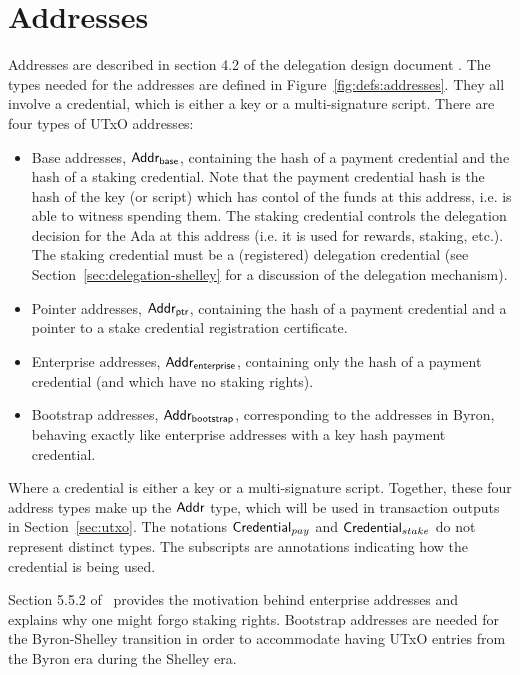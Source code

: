 \section{Addresses}
\label{sec:addresses}

Addresses are described in section 4.2 of the delegation design document \cite{delegation_design}.
The types needed for the addresses are defined in Figure~\ref{fig:defs:addresses}.
They all involve a credential, which is either a key or a multi-signature script.
There are four types of UTxO addresses:
\begin{itemize}
\item Base addresses, $\mathsf{Addr_{base}}$, containing the hash of a payment credential and
  the hash of a staking credential. Note that the payment credential hash is the
  hash of the key (or script) which has contol of the funds at this address,
  i.e. is able to witness spending
  them. The staking credential controls the delegation
  decision for the Ada at this address (i.e. it is used for rewards, staking,
  etc.).
  The staking credential
  must be a (registered) delegation credential (see Section~\ref{sec:delegation-shelley}
  for a discussion of the delegation mechanism).
\item Pointer addresses, $\mathsf{Addr_{ptr}}$, containing the hash of a payment credential
  and a pointer to a stake credential registration certificate.
\item Enterprise addresses, $\mathsf{Addr_{enterprise}}$,
  containing only the hash of a payment credential (and which have no staking rights).
\item Bootstrap addresses, $\mathsf{Addr_{bootstrap}}$, corresponding to the addresses in
  Byron, behaving exactly like enterprise addresses with a key hash
  payment credential.
\end{itemize}

\noindent Where a credential is either a key or a multi-signature script. Together, these
four address types make up the $\mathsf{Addr}$ type, which will be used in transaction
outputs in Section~\ref{sec:utxo}. The notations
$\mathsf{Credential}_{pay}$ and $\mathsf{Credential}_{stake}$ do not represent distinct types.
The subscripts are annotations indicating how the credential is being used.

Section 5.5.2 of~\cite{delegation_design} provides the motivation behind enterprise
addresses and explains why one might forgo staking rights.
Bootstrap addresses are needed for the Byron-Shelley transition in order to
accommodate having UTxO entries from the Byron era during the Shelley era.

